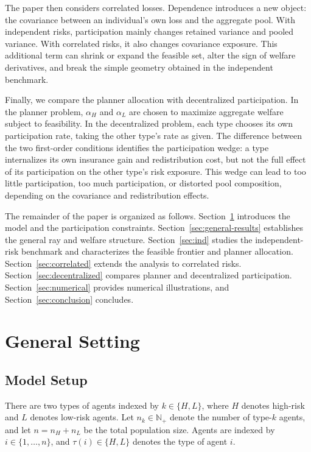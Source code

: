 \documentclass[a4paper,12pt]{article}
\theoremstyle{definition}
\theoremstyle{remark}
\newcommand{\1}{\mathbf{1}}
\begin{document}
The paper then considers correlated losses. Dependence introduces a new object: the covariance between an individual's own loss and the aggregate pool. With independent risks, participation mainly changes retained variance and pooled variance. With correlated risks, it also changes covariance exposure. This additional term can shrink or expand the feasible set, alter the sign of welfare derivatives, and break the simple geometry obtained in the independent benchmark.

Finally, we compare the planner allocation with decentralized participation. In the planner problem, \(\alpha_H\) and \(\alpha_L\) are chosen to maximize aggregate welfare subject to feasibility. In the decentralized problem, each type chooses its own participation rate, taking the other type's rate as given. The difference between the two first-order conditions identifies the participation wedge: a type internalizes its own insurance gain and redistribution cost, but not the full effect of its participation on the other type's risk exposure. This wedge can lead to too little participation, too much participation, or distorted pool composition, depending on the covariance and redistribution effects.

The remainder of the paper is organized as follows. Section~\ref{sec:model} introduces the model and the participation constraints. Section~\ref{sec:general-results} establishes the general ray and welfare structure. Section~\ref{sec:ind} studies the independent-risk benchmark and characterizes the feasible frontier and planner allocation. Section~\ref{sec:correlated} extends the analysis to correlated risks. Section~\ref{sec:decentralized} compares planner and decentralized participation. Section~\ref{sec:numerical} provides numerical illustrations, and Section~\ref{sec:conclusion} concludes.
\section{General Setting}\label{sec:model}

\subsection{Model Setup}

There are two types of agents indexed by \(k\in\{H,L\}\), where \(H\) denotes high-risk and \(L\) denotes low-risk agents. Let \(n_k\in\mathbb{N}_+\) denote the number of type-\(k\) agents, and let \(n=n_H+n_L\) be the total population size. Agents are indexed by \(i\in\{1,\dots,n\}\), and \(\tau(i)\in\{H,L\}\) denotes the type of agent \(i\).
\end{document}
